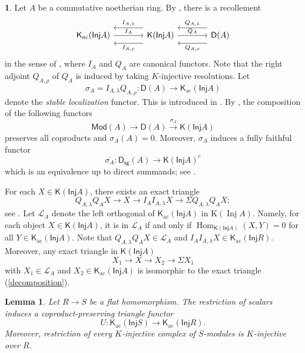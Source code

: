 \documentclass{amsart}
\newcommand{\D}{\mathsf{D}}
\newcommand{\K}{\mathsf{K}}
\newcommand{\0}{{\bf{0}}}
\DeclareMathOperator{\ac}{ac}
\DeclareMathOperator{\Hom}{Hom}
\newcommand{\sg}{\mathsf{sg}}
\newcommand{\Mod}{\mathsf{Mod}}
\newcommand{\Inj}{\mathsf{Inj}}
\newtheorem{lemma}[theorem]{Lemma}
\theoremstyle{definition}
\newtheorem{chunk}[theorem]{}
\begin{document}
\begin{chunk}\label{recollement}
Let $A$ be a commutative noetherian ring. By \cite[Corollary 4.3]{Krause2005}, there is a recollement
\[
\begin{tikzcd}[column sep=large, row sep=large]
\K_{\ac}(\Inj A)
  \arrow[r, "I_A"]
&
\K(\Inj A)
  \arrow[l, shift left=2.2ex, "I_{A,\rho}"]
  \arrow[l, shift right=2.2ex, "I_{A, \lambda}"']
  \arrow[r, "Q_A"]
&
\D(A)
  \arrow[l, shift left=2.2ex, "Q_{A,\rho}"]
  \arrow[l, shift right=2.2ex, "Q_{A,\lambda}"']
\end{tikzcd}
\]
in the sense of \cite{BBD}, where $I_A$ and $Q_A$ are canonical functors. Note that the right adjoint $Q_{A,\rho}$ of $Q_A$ is induced by taking $K$-injective resolutions. 
Let 
$$
\sigma_A=I_{A,\lambda} Q_{A,\rho}\colon \D(A)\rightarrow \K_{\ac}(\Inj A)
$$
 denote the \emph{stable localization} functor. This is introduced in 
 \cite[Section 5]{Krause2005}. By \cite[Corollary 5.5]{Krause2005}, the composition of the following functors
 $$
 \Mod(A)\to \D(A)\xrightarrow{\sigma_A} \K(\Inj A)
 $$
 preserves all coproducts and $\sigma_A(A)=0$. Moreover, $\sigma_A$ induces a fully faithful functor
 $$
 \overline{\sigma_A}\colon \D_{\sg}(A)\rightarrow \K(\Inj A)^c
 $$
 which is an equivalence up to direct summands; see \cite[Corollary 5.4]{Krause2005}. 

 For each $X\in\K(\Inj A)$, there exists an exact triangle
 \begin{equation}\label{decomposition}
      Q_{A,\lambda}Q_A X\to X\to I_AI_{A,\lambda}X\to \Sigma Q_{A,\lambda}Q_A X;
 \end{equation}
 see \cite[page 1135]{Krause2005}. 
 Let \(\mathcal L_A\) denote the left orthogonal of \(\K_{\ac}(\Inj A)\) in
\(\mathrm K(\operatorname{Inj}A)\). Namely, for each object $X\in\K(\Inj A)$, it is in $\mathcal L_A$ if and only if 
 $\Hom_{\K(\Inj A)}(X,Y)=0$ for all $Y\in \K_{\ac}(\Inj A)$. 
Note that $Q_{A,\lambda}Q_A X\in \mathcal L_A$ and $I_AI_{A,\lambda}X\in\K_{\ac}(\Inj R)$. Moreover, any exact triangle in $\K(\Inj A)$
$$
X_1\to X\to X_2\to \Sigma X_1
$$
with $X_1\in \mathcal L_A$ and $X_2\in \K_{\ac}(\Inj A)$ is isomorphic to the exact triangle (\ref{decomposition}).
\end{chunk}
\begin{lemma}\label{restric-fun}
Let \(R\to S\) be a flat homomorphism. The restriction of scalars induces a coproduct-preserving triangle functor
\[
U\colon\K_{\ac}(\Inj S)\longrightarrow\K_{\ac}(\Inj R).
\]
Moreover, restriction of every \(K\)-injective complex of \(S\)-modules is \(K\)-injective over \(R\).
\end{lemma}
\end{document}
